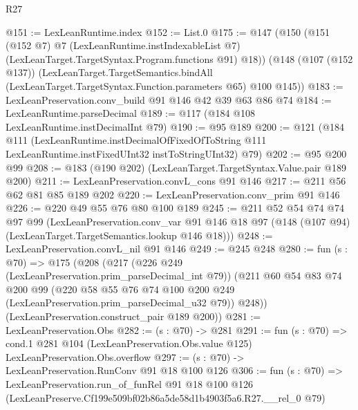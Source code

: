 \begin{lexlean}{R27}
\begin{coremodule}
@151 := LexLeanRuntime.index
@152 := List.{0}
@175 := @147
    (@150
      (@151
        (@152 @7)
        @7
        (LexLeanRuntime.instIndexableList @7)
        (LexLeanTarget.TargetSyntax.Program.functions @91)
        @18))
    (@148
      (@107 (@152 @137))
      (LexLeanTarget.TargetSemantics.bindAll
        (LexLeanTarget.TargetSyntax.Function.parameters @65)
        @100
        @145))
@183 := LexLeanPreservation.conv_build @91 @146 @42 @39 @63 @86 @74
@184 := LexLeanRuntime.parseDecimal
@189 := @117 (@184 @108 LexLeanRuntime.instDecimalInt @79)
@190 := @95 @189
@200 := @121
    (@184
      @111
      (LexLeanRuntime.instDecimalOfFixedOfToString
        @111
        LexLeanRuntime.instFixedUInt32
        instToStringUInt32)
      @79)
@202 := @95 @200 @99
@208 := @183 (@190 @202) (LexLeanTarget.TargetSyntax.Value.pair @189 @200)
@211 := LexLeanPreservation.convL_cons @91 @146
@217 := @211 @56 @62 @81 @85 @189 @202
@220 := LexLeanPreservation.conv_prim @91 @146
@226 := @220 @49 @55 @76 @80 @100 @189
@245 := @211
    @52
    @54
    @74
    @74
    @97
    @99
    (LexLeanPreservation.conv_var
      @91
      @146
      @18
      @97
      (@148 (@107 @94) (LexLeanTarget.TargetSemantics.lookup @146 @18)))
@248 := LexLeanPreservation.convL_nil @91 @146
@249 := @245 @248
@280 := fun (s : @70) =>
  @175
    (@208
      (@217
        (@226 @249 (LexLeanPreservation.prim_parseDecimal_int @79))
        (@211
          @60
          @54
          @83
          @74
          @200
          @99
          (@220 @58 @55 @76 @74 @100 @200 @249 (LexLeanPreservation.prim_parseDecimal_u32 @79))
          @248))
      (LexLeanPreservation.construct_pair @189 @200))
@281 := LexLeanPreservation.Obs
@282 := (s : @70) -> @281
@291 := fun (s : @70) =>
  cond.{1} @281 @104 (LexLeanPreservation.Obs.value @125) LexLeanPreservation.Obs.overflow
@297 := (s : @70) -> LexLeanPreservation.RunConv @91 @18 @100 @126
@306 := fun (s : @70) =>
  LexLeanPreservation.run_of_funRel
    @91
    @18
    @100
    @126
    (LexLeanPreserve.Cf199e509bf02b86a5de58d1b4903f5a6.R27.__rel_0 @79)
\end{coremodule}
\end{lexlean}
